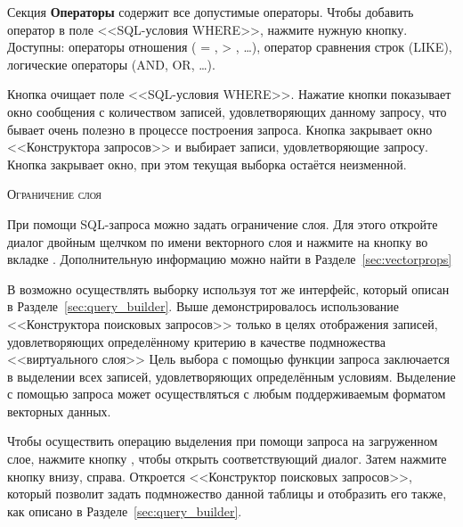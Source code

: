 Секция \textbf{Операторы} содержит все допустимые операторы. Чтобы добавить
оператор в поле <<SQL-условия WHERE>>, нажмите нужную кнопку. Доступны:
операторы отношения ( = , > , \dots), оператор сравнения строк (LIKE),
логические операторы (AND, OR, \dots).

Кнопка  очищает поле <<SQL-условия WHERE>>. Нажатие кнопки
 показывает окно сообщения с количеством записей,
удовлетворяющих данному запросу, что бывает очень полезно в процессе
построения запроса. Кнопка  закрывает окно <<Конструктора
запросов>> и выбирает записи, удовлетворяющие запросу. Кнопка
 закрывает окно, при этом текущая выборка остаётся
неизменной.

\begin{Tip}\caption{\textsc{Ограничение слоя}}
При помощи SQL-запроса можно задать ограничение слоя. Для этого откройте
диалог  двойным щелчком по имени векторного слоя
и нажмите на кнопку  во вкладке .
Дополнительную информацию можно найти в Разделе~\ref{sec:vectorprops}
\end{Tip}

\label{sec:select_by_query}

В \qg возможно осуществлять выборку используя тот же интерфейс,
который описан в Разделе~\ref{sec:query_builder}. Выше демонстрировалось
использование <<Конструктора поисковых запросов>> только в целях отображения
записей, удовлетворяющих определённому критерию в качестве подмножества %
<<виртуального слоя>> Цель выбора с помощью функции запроса заключается
в выделении всех записей, удовлетворяющих определённым условиям. Выделение
с помощью запроса может осуществляться с любым поддерживаемым форматом
векторных данных.

Чтобы осуществить операцию выделения при помощи запроса на загруженном слое,
нажмите кнопку ,
чтобы открыть соответствующий диалог. Затем нажмите кнопку
 внизу, справа. Откроется <<Конструктор поисковых
запросов>>, который позволит задать подмножество данной таблицы и отобразить
его также, как описано в Разделе~\ref{sec:query_builder}.

